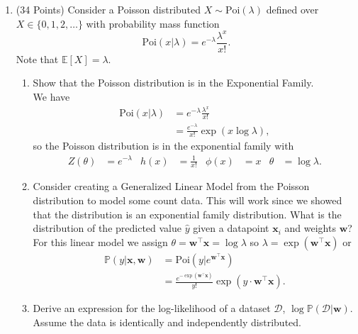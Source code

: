 \documentclass[letter, 12pt]{article}
\begin{document}
\begin{enumerate}
\begin{enumerate}
    \end{enumerate}
    \clearpage
\item (34 Points) Consider a Poisson distributed $X\sim \mathrm{Poi}(\lambda)$ defined
    over $X\in\{0,1,2,\dots\}$ with probability mass function
    \[
        \mathrm{Poi}(x|\lambda) = e^{-\lambda}\frac{\lambda^x}{x!}.
    \]
    Note that $\mathbb{E}[X] = \lambda$.
    \begin{enumerate}
        \item Show that the Poisson distribution is in the Exponential Family.\\[1em]
            We have
            \begin{align*}
                \mathrm{Poi}(x|\lambda) &= e^{-\lambda}\frac{\lambda^x}{x!}\\
                &= \frac{e^{-\lambda}}{x!}\exp\left(x\log\lambda\right),
            \end{align*}
            so the Poisson distribution is in the exponential family with
            \begin{align*}
                Z(\theta) &= e^{-\lambda} & h(x) &= \frac{1}{x!} & \phi(x) &= x & \theta &= \log\lambda.
            \end{align*}
            \vfill\vfill
        \item Consider creating a Generalized Linear Model from the Poisson distribution
            to model some count data. This will work since we showed that the distribution
            is an exponential family distribution. What is the distribution of the
            predicted value $\hat y$ given a datapoint $\mathbf{x}_i$ and weights
            $\mathbf{w}$?\\[1em]
            For this linear model we assign $\theta = \mathbf{w}^\top\mathbf{x} = \log\lambda$
            so $\lambda = \exp\left(\mathbf{w}^\top\mathbf{x}\right)$ or
            \begin{align*}
                \mathbb{P}(y|\mathbf{x},\mathbf{w}) &= \mathrm{Poi}\left(y|e^{\mathbf{w}^\top\mathbf{x}}\right)\\
                &= \frac{e^{-\exp(\mathbf{w}^\top\mathbf{x})}}{y!}\exp\left(y\cdot\mathbf{w}^\top\mathbf{x}\right).
            \end{align*}
            \vfill\clearpage
        \item Derive an expression for the log-likelihood of a dataset $\mathcal{D}$,
            $\log\mathbb{P}(\mathcal{D}|\mathbf{w})$. Assume the data is identically and
            independently distributed.\\[1em]

\end{enumerate}
\end{enumerate}
\end{document}
